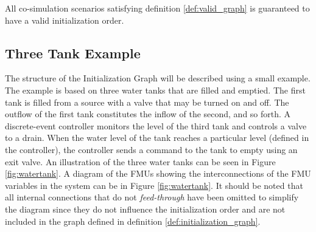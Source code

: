 \documentclass[runningheads]{llncs}
\begin{document}
All co-simulation scenarios satisfying definition \ref{def:valid_graph} is guaranteed to have a valid initialization order.  

\subsection{Three Tank Example}
The structure of the Initialization Graph will be described using a small example. 
The example is based on three water tanks that are filled and emptied. The first tank is filled from a source with a valve that may be turned on and off. The outflow of the first tank constitutes the inflow of the second, and so forth. A discrete-event controller monitors the level of the third tank and controls a valve to a drain. When the water level of the tank reaches a particular level (defined in the controller), the controller sends a command to the tank to empty using an exit valve. An illustration of the three water tanks can be seen in Figure \ref{fig:watertank}. A diagram of the FMUs showing the interconnections of the FMU variables in the system can be in Figure \ref{fig:watertank}. It should be noted that all internal connections that do not \textit{feed-through} have been omitted to simplify the diagram since they do not influence the initialization order and are not included in the graph defined in definition \ref{def:initialization_graph}. 
\end{document}

